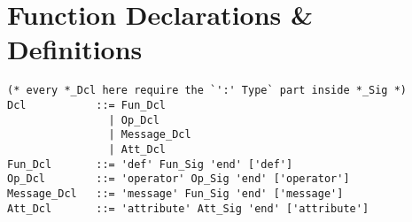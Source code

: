



\newpage

\section{Function Declarations \& Definitions}
\label{sec:function-decls-defs}

\grammar\begin{lstlisting}
(* every *_Dcl here require the `':' Type` part inside *_Sig *)
Dcl           ::= Fun_Dcl
                | Op_Dcl
                | Message_Dcl 
                | Att_Dcl
Fun_Dcl       ::= 'def' Fun_Sig 'end' ['def']
Op_Dcl        ::= 'operator' Op_Sig 'end' ['operator']
Message_Dcl   ::= 'message' Fun_Sig 'end' ['message']
Att_Dcl       ::= 'attribute' Att_Sig 'end' ['attribute']


\end{lstlisting}

